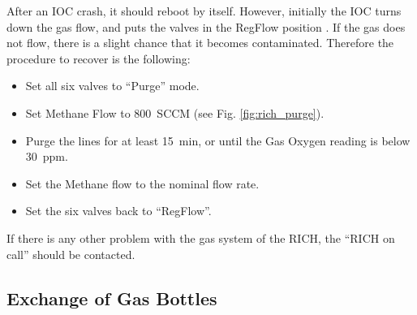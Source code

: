 {After an IOC crash, it should reboot by itself.
However, initially the IOC turns down the gas flow, and puts
the valves in the RegFlow position . 
If the gas does not flow,
there is a slight chance that it becomes contaminated. 
Therefore the procedure to recover is the following:
\begin{itemize}
\item Set all six valves to ``Purge'' mode.
\item Set Methane Flow to 800~SCCM (see Fig. \ref{fig:rich_purge}).
\item Purge the lines for at least 15~min, or until the Gas Oxygen 
reading is below 30~ppm.
\item Set the Methane flow to the nominal flow rate.
\item Set the six valves back to ``RegFlow''.
\end{itemize}


If there is any other problem with the gas system of the RICH,
the ``RICH on call'' should be contacted.




\subsection{Exchange of Gas Bottles}

}
